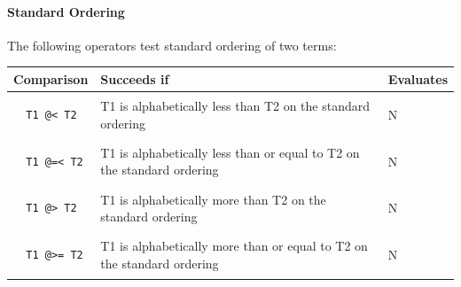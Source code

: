 \documentclass{article}
\begin{document}
\begin{multicols}{2}
  \paragraph{Standard Ordering} The following operators test standard ordering of two terms:
  
  \noindent 
  \begin{tabular}{ | p{2cm} | p{4cm} | p{1.4cm} | }
  \hline
  \bf Comparison & \bf Succeeds if & \bf Evaluates \\
  \hline
  
  \begin{lstlisting}
  T1 @< T2
  \end{lstlisting} & T1 is alphabetically less than T2 on the standard ordering & N \\
  \hline
  
  \begin{lstlisting}
  T1 @=< T2
  \end{lstlisting} & T1 is alphabetically less than or equal to T2 on the standard ordering & N \\
  \hline
  
  \begin{lstlisting}
  T1 @> T2
  \end{lstlisting} & T1 is alphabetically more than T2 on the standard ordering & N \\
  \hline
  
  \begin{lstlisting}
  T1 @>= T2
  \end{lstlisting} & T1 is alphabetically more than or equal to T2 on the standard ordering & N \\
  \hline
  
  \end{tabular}

  \end{multicols}
\end{document}

